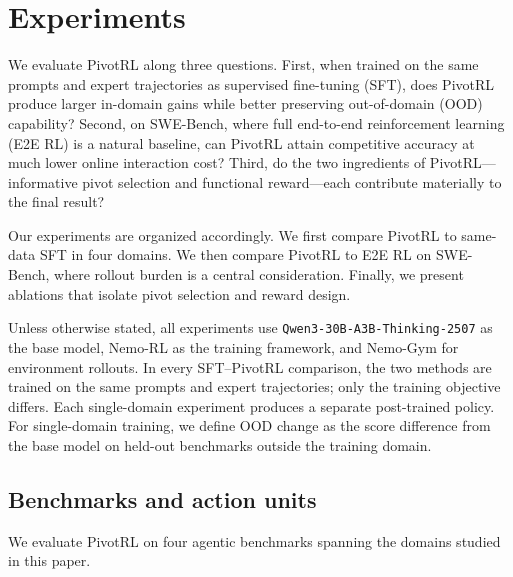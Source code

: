 \section{Experiments}
\label{sec:experiments}

We evaluate PivotRL along three questions. First, when trained on the same prompts and expert trajectories as supervised fine-tuning (SFT), does PivotRL produce larger in-domain gains while better preserving out-of-domain (OOD) capability? Second, on SWE-Bench, where full end-to-end reinforcement learning (E2E RL) is a natural baseline, can PivotRL attain competitive accuracy at much lower online interaction cost? Third, do the two ingredients of PivotRL---informative pivot selection and functional reward---each contribute materially to the final result?

Our experiments are organized accordingly. We first compare PivotRL to same-data SFT in four domains. We then compare PivotRL to E2E RL on SWE-Bench, where rollout burden is a central consideration. Finally, we present ablations that isolate pivot selection and reward design.

Unless otherwise stated, all experiments use \texttt{Qwen3-30B-A3B-Thinking-2507} as the base model, Nemo-RL \citep{nemo-rl} as the training framework, and Nemo-Gym \citep{nemo-gym} for environment rollouts. In every SFT--PivotRL comparison, the two methods are trained on the same prompts and expert trajectories; only the training objective differs. Each single-domain experiment produces a separate post-trained policy. For single-domain training, we define OOD change as the score difference from the base model on held-out benchmarks outside the training domain.

\subsection{Benchmarks and action units}
\label{sec:exp_questions_benchmarks}

We evaluate PivotRL on four agentic benchmarks spanning the domains studied in this paper.

